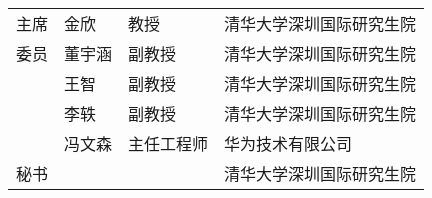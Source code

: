 \begin{committee}[name={学位论文指导小组、公开评阅人和答辩委员会名单}]
  \begin{center}
    \begin{tabular}{C{2.75cm}C{2.98cm}C{3.63cm}C{5.63cm}@{}}
      主席 & 金欣                  & 教授                    & 清华大学深圳国际研究生院       \\
      委员 & 董宇涵                  & 副教授                    & 清华大学深圳国际研究生院       \\
          & 王智                  & 副教授                    & 清华大学深圳国际研究生院       \\
          & 李轶                  & 副教授                  & 清华大学深圳国际研究生院       \\
          & 冯文森                &  主任工程师              & 华为技术有限公司 \\
      秘书 &                   &               & 清华大学深圳国际研究生院       \\
    \end{tabular}
  \end{center}

\end{committee}



